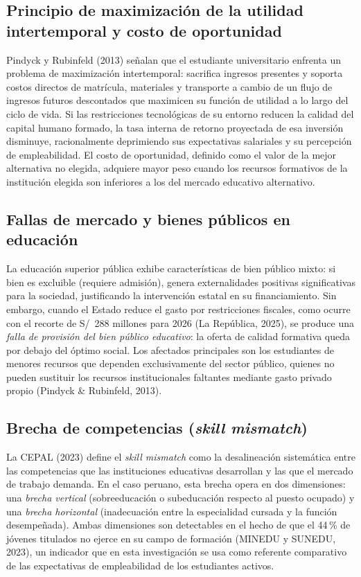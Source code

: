 \documentclass[11pt, a4paper]{article}
\begin{document}
\subsection{Principio de maximización de la utilidad intertemporal y costo de oportunidad}

Pindyck y Rubinfeld (2013) señalan que el estudiante universitario enfrenta un problema de maximización intertemporal: sacrifica ingresos presentes y soporta costos directos de matrícula, materiales y transporte a cambio de un flujo de ingresos futuros descontados que maximicen su función de utilidad a lo largo del ciclo de vida. Si las restricciones tecnológicas de su entorno reducen la calidad del capital humano formado, la tasa interna de retorno proyectada de esa inversión disminuye, racionalmente deprimiendo sus expectativas salariales y su percepción de empleabilidad. El costo de oportunidad, definido como el valor de la mejor alternativa no elegida, adquiere mayor peso cuando los recursos formativos de la institución elegida son inferiores a los del mercado educativo alternativo.

\subsection{Fallas de mercado y bienes públicos en educación}

La educación superior pública exhibe características de bien público mixto: si bien es excluible (requiere admisión), genera externalidades positivas significativas para la sociedad, justificando la intervención estatal en su financiamiento. Sin embargo, cuando el Estado reduce el gasto por restricciones fiscales, como ocurre con el recorte de S/~288 millones para 2026 (La República, 2025), se produce una \textit{falla de provisión del bien público educativo}: la oferta de calidad formativa queda por debajo del óptimo social. Los afectados principales son los estudiantes de menores recursos que dependen exclusivamente del sector público, quienes no pueden sustituir los recursos institucionales faltantes mediante gasto privado propio (Pindyck \& Rubinfeld, 2013).

\subsection{Brecha de competencias (\textit{skill mismatch})}

La CEPAL (2023) define el \textit{skill mismatch} como la desalineación sistemática entre las competencias que las instituciones educativas desarrollan y las que el mercado de trabajo demanda. En el caso peruano, esta brecha opera en dos dimensiones: una \textit{brecha vertical} (sobreeducación o subeducación respecto al puesto ocupado) y una \textit{brecha horizontal} (inadecuación entre la especialidad cursada y la función desempeñada). Ambas dimensiones son detectables en el hecho de que el 44\,\% de jóvenes titulados no ejerce en su campo de formación (MINEDU y SUNEDU, 2023), un indicador que en esta investigación se usa como referente comparativo de las expectativas de empleabilidad de los estudiantes activos.
\end{document}
